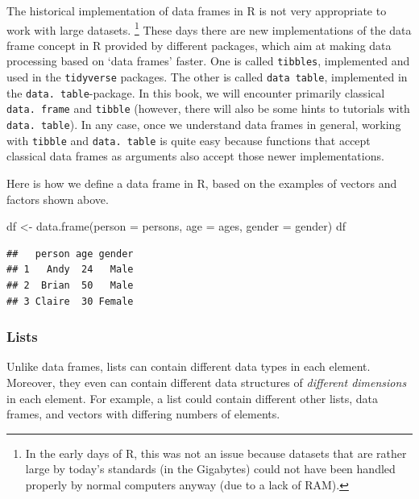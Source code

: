 \documentclass[
  12pt,
]{style/krantz}
\newenvironment{Shaded}{\begin{snugshade}}{\end{snugshade}}
\newcommand{\AttributeTok}[1]{\textcolor[rgb]{0.77,0.63,0.00}{#1}}
\newcommand{\FunctionTok}[1]{\textcolor[rgb]{0.00,0.00,0.00}{#1}}
\newcommand{\NormalTok}[1]{#1}
\newcommand{\OtherTok}[1]{\textcolor[rgb]{0.56,0.35,0.01}{#1}}
\begin{document}
The historical implementation of data frames in R is not very appropriate to work with large datasets. \footnote{In the early days of R, this was not an issue because datasets that are rather large by today's standards (in the Gigabytes) could not have been handled properly by normal computers anyway (due to a lack of RAM).} These days there are new implementations of the data frame concept in R provided by different packages, which aim at making data processing based on `data frames' faster. One is called \texttt{tibbles}, implemented and used in the \texttt{tidyverse} packages. The other is called \texttt{data\ table}, implemented in the \texttt{data.\ table}-package. In this book, we will encounter primarily classical \texttt{data.\ frame} and \texttt{tibble} (however, there will also be some hints to tutorials with \texttt{data.\ table}). In any case, once we understand data frames in general, working with \texttt{tibble} and \texttt{data.\ table} is quite easy because functions that accept classical data frames as arguments also accept those newer implementations.

Here is how we define a data frame in R, based on the examples of vectors and factors shown above.

\begin{Shaded}
\begin{Highlighting}[]
\NormalTok{df }\OtherTok{\textless{}{-}} \FunctionTok{data.frame}\NormalTok{(}\AttributeTok{person =}\NormalTok{ persons, }\AttributeTok{age =}\NormalTok{ ages, }\AttributeTok{gender =}\NormalTok{ gender)}
\NormalTok{df}
\end{Highlighting}
\end{Shaded}

\begin{verbatim}
##   person age gender
## 1   Andy  24   Male
## 2  Brian  50   Male
## 3 Claire  30 Female
\end{verbatim}

\hypertarget{lists}{%
\subsubsection{Lists}\label{lists}}

Unlike data frames, lists can contain different data types in each element. Moreover, they even can contain different data structures of \emph{different dimensions} in each element. For example, a list could contain different other lists, data frames, and vectors with differing numbers of elements.
\end{document}
